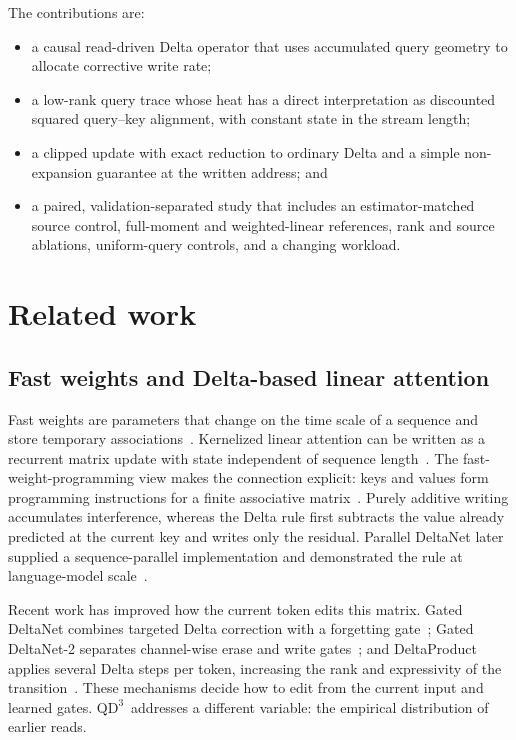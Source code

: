 \documentclass[pdflatex,sn-mathphys-num]{sn-jnl}
\theoremstyle{thmstyleone}
\newcommand{\QDDD}{\ensuremath{\mathrm{QD}^{3}}}
\begin{document}
The contributions are:
\begin{itemize}
  \item a causal read-driven Delta operator that uses accumulated query geometry to allocate corrective write rate;
  \item a low-rank query trace whose heat has a direct interpretation as discounted squared query--key alignment, with constant state in the stream length;
  \item a clipped update with exact reduction to ordinary Delta and a simple non-expansion guarantee at the written address; and
  \item a paired, validation-separated study that includes an estimator-matched source control, full-moment and weighted-linear references, rank and source ablations, uniform-query controls, and a changing workload.
\end{itemize}

\section{Related work}\label{sec:related}

\subsection{Fast weights and Delta-based linear attention}

Fast weights are parameters that change on the time scale of a sequence and store temporary associations~\cite{schmidhuber1992,ba2016}. Kernelized linear attention can be written as a recurrent matrix update with state independent of sequence length~\cite{katharopoulos2020}. The fast-weight-programming view makes the connection explicit: keys and values form programming instructions for a finite associative matrix~\cite{schlag2021}. Purely additive writing accumulates interference, whereas the Delta rule first subtracts the value already predicted at the current key and writes only the residual. Parallel DeltaNet later supplied a sequence-parallel implementation and demonstrated the rule at language-model scale~\cite{yang2024parallel}.

Recent work has improved how the current token edits this matrix. Gated DeltaNet combines targeted Delta correction with a forgetting gate~\cite{yang2025gated}; Gated DeltaNet-2 separates channel-wise erase and write gates~\cite{hatamizadeh2026gdn2}; and DeltaProduct applies several Delta steps per token, increasing the rank and expressivity of the transition~\cite{siems2025deltaproduct}. These mechanisms decide how to edit from the current input and learned gates. \QDDD\ addresses a different variable: the empirical distribution of earlier reads.
\end{document}
